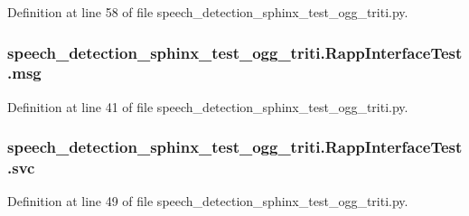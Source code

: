 Definition at line 58 of file speech\-\_\-detection\-\_\-sphinx\-\_\-test\-\_\-ogg\-\_\-triti.\-py.

\hypertarget{classspeech__detection__sphinx__test__ogg__triti_1_1RappInterfaceTest_a6d5cf4a4367057b4d7dff4664e71ded2}{
\subsubsection[{msg}]{\setlength{\rightskip}{0pt plus 5cm}speech\-\_\-detection\-\_\-sphinx\-\_\-test\-\_\-ogg\-\_\-triti.\-Rapp\-Interface\-Test.\-msg}}\label{classspeech__detection__sphinx__test__ogg__triti_1_1RappInterfaceTest_a6d5cf4a4367057b4d7dff4664e71ded2}


Definition at line 41 of file speech\-\_\-detection\-\_\-sphinx\-\_\-test\-\_\-ogg\-\_\-triti.\-py.

\hypertarget{classspeech__detection__sphinx__test__ogg__triti_1_1RappInterfaceTest_a1e28b1192e41f42e1e3103ffb6f7eda0}{
\subsubsection[{svc}]{\setlength{\rightskip}{0pt plus 5cm}speech\-\_\-detection\-\_\-sphinx\-\_\-test\-\_\-ogg\-\_\-triti.\-Rapp\-Interface\-Test.\-svc}}\label{classspeech__detection__sphinx__test__ogg__triti_1_1RappInterfaceTest_a1e28b1192e41f42e1e3103ffb6f7eda0}


Definition at line 49 of file speech\-\_\-detection\-\_\-sphinx\-\_\-test\-\_\-ogg\-\_\-triti.\-py.

